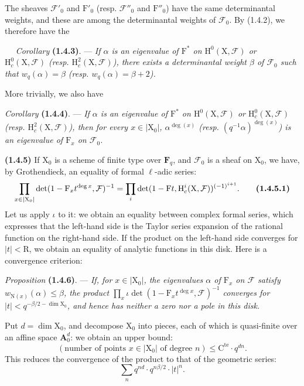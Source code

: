 \documentclass[11pt,leqno]{article}
\newcommand{\Page}[1]{\ifvmode\noindent\else\unskip\ \fi{\footnotesize\textcolor{gray}{[p.\,#1]}}\ \ignorespaces}
\begin{document}
The sheaves \(\mathcal{F}'_0\) and \(\mathrm{F}'_0\) (resp. \(\mathcal{F}''_0\) and \(\mathrm{F}''_0\)) have the same determinantal weights, and these are among the determinantal weights of \(\mathcal{F}_0\). By (1.4.2), we therefore have the

\Page{163}
\textit{Corollary} \textbf{(1.4.3)}. — \textit{If \(\alpha\) is an eigenvalue of \(\mathrm{F}^*\) on \(\mathrm{H}^0(\mathrm{X},\mathcal{F})\) or \(\mathrm{H}_c^0(\mathrm{X},\mathcal{F})\) (resp. \(\mathrm{H}_c^2(\mathrm{X},\mathcal{F})\)), there exists a determinantal weight \(\beta\) of \(\mathcal{F}_0\) such that \(w_q(\alpha)=\beta\) (resp. \(w_q(\alpha)=\beta+2\)).}

More trivially, we also have

\textit{Corollary} \textbf{(1.4.4)}. — \textit{If \(\alpha\) is an eigenvalue of \(\mathrm{F}^*\) on \(\mathrm{H}^0(\mathrm{X},\mathcal{F})\) or \(\mathrm{H}_c^0(\mathrm{X},\mathcal{F})\) (resp. \(\mathrm{H}_c^2(\mathrm{X},\mathcal{F})\)), then for every \(x\in|\mathrm{X}_0|\), \(\alpha^{\deg(x)}\) (resp. \((q^{-1}\alpha)^{\deg(x)}\)) is an eigenvalue of \(\mathrm{F}_x\) on \(\mathcal{F}_0\).}

\textbf{(1.4.5)} If \(\mathrm{X}_0\) is a scheme of finite type over \(\mathbf{F}_q\), and \(\mathcal{F}_0\) is a sheaf on \(\mathrm{X}_0\), we have, by Grothendieck, an equality of formal \(\ell\)-adic series:
\[
\prod_{x\in|\mathrm{X}_0|}
\det(1-\mathrm{F}_x t^{\deg x},\mathcal{F})^{-1}
=
\prod_i\det(1-\mathrm{F}t,\mathrm{H}_c^i(\mathrm{X},\mathcal{F}))^{(-1)^{i+1}}.
\tag*{\textbf{(1.4.5.1)}}
\]
Let us apply \(\iota\) to it: we obtain an equality between complex formal series, which expresses that the left-hand side is the Taylor series expansion of the rational function on the right-hand side. If the product on the left-hand side converges for \(|t|<\mathrm{R}\), we obtain an equality of analytic functions in this disk. Here is a convergence criterion:

\textit{Proposition} \textbf{(1.4.6)}. — \textit{If, for \(x\in|\mathrm{X}_0|\), the eigenvalues \(\alpha\) of \(\mathrm{F}_x\) on \(\mathcal{F}\) satisfy \(w_{\mathrm{N}(x)}(\alpha)\le\beta\), the product \(\prod_x\iota\det(1-\mathrm{F}_x t^{\deg x},\mathcal{F})^{-1}\) converges for \(|t|<q^{-\beta/2-\dim\mathrm{X}_0}\), and hence has neither a zero nor a pole in this disk.}

Put \(d=\dim\mathrm{X}_0\), and decompose \(\mathrm{X}_0\) into pieces, each of which is quasi-finite over an affine space \(\mathbf{A}_0^d\): we obtain an upper bound:
\[
(\text{number of points }x\in|\mathrm{X}_0|\text{ of degree }n)
\le\mathrm{C}^{\mathrm{te}}\cdot q^{dn}.
\]
This reduces the convergence of the product to that of the geometric series:
\[
\sum_n q^{nd}\cdot q^{n\beta/2}\cdot|t|^n.
\]
\end{document}
